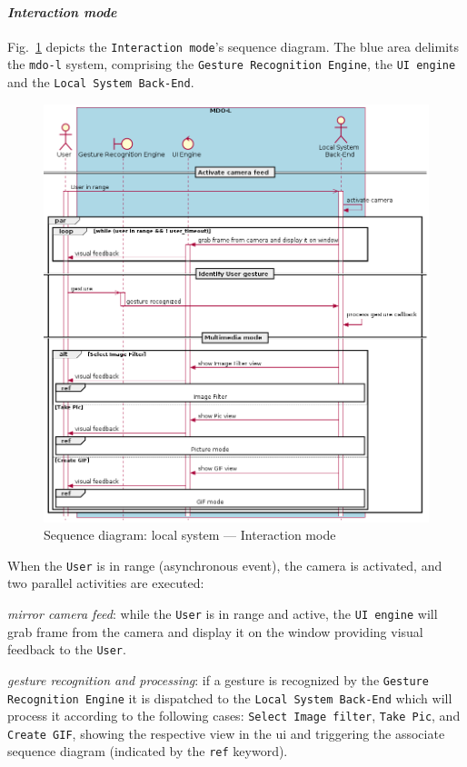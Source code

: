 \paragraph{\emph{Interaction mode}}
Fig.~\ref{fig:seq-local-interaction-mode} depicts the \texttt{Interaction
  mode}'s sequence diagram. The blue area delimits the \texttt{\gls{mdo-l}}
system, comprising the \texttt{Gesture Recognition Engine}, the \texttt{UI
  engine} and the \texttt{Local System Back-End}.
%
\begin{figure}[htb!]
  \centering
  \includegraphics[width=0.8\columnwidth]{./img/seq-local-interaction-mode.png}
  \caption{Sequence diagram: local system --- Interaction mode}%
\label{fig:seq-local-interaction-mode}
\end{figure}

When the \texttt{User} is in range (asynchronous event), the camera is
activated, and two parallel activities are executed:
\begin{item-c}
\item \emph{mirror camera feed}: while the \texttt{User} is in range and
active, the \texttt{UI engine} will grab frame from the camera and display it on
the window providing visual feedback to the \texttt{User}.
\item \emph{gesture recognition and processing}: if a gesture is recognized by
  the \texttt{Gesture Recognition Engine} it is dispatched to the \texttt{Local
    System Back-End} which will process it according to the following cases:
  \texttt{Select Image filter}, \texttt{Take Pic}, and \texttt{Create GIF},
  showing the respective view in the \gls{ui} and triggering the associate
  sequence diagram (indicated by the \texttt{ref} keyword).
\end{item-c}
%
